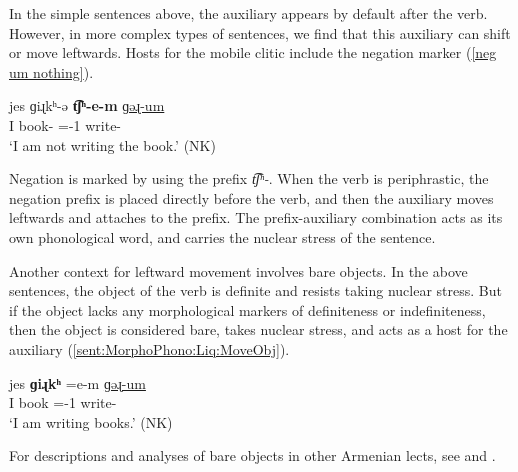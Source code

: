 In the simple sentences above, the auxiliary appears by default after the verb. However, in more complex types of sentences, we find that this auxiliary  can shift or move leftwards.  Hosts for the mobile clitic include the negation marker (\ref{neg um nothing}). 

\begin{exe}
	\ex \gll jes   ɡiɻkʰ-ə   \textbf{t͡ʃʰ\colorbox{lsLightGray}{-e-m}}   \uline{ɡəɻ-um}
	\\
	I   book-{}  {\neggloss}={\auxgloss}-1{\sg}  write-{\impfcvb} 
	\\
	\trans `I am not writing the book.'  \hfill (NK)\label{neg um nothing}
	\\
	
	
\end{exe}

Negation is marked by using the prefix \textit{t͡ʃʰ-}. When the verb is periphrastic, the negation prefix is placed directly before the verb, and then the auxiliary moves leftwards and attaches to the prefix. The prefix-auxiliary combination acts as its own phonological word, and   carries the nuclear stress of the sentence.  

Another context for leftward movement involves bare objects. In the above sentences, the object of the verb is  definite and resists taking nuclear stress. But if the object lacks any morphological markers of definiteness or indefiniteness, then the object is considered bare, takes nuclear stress, and acts as a host for the auxiliary (\ref{sent:MorphoPhono:Liq:MoveObj}).

\begin{exe}
	\ex \gll jes   \textbf{ɡiɻkʰ}   \colorbox{lsLightGray}{=e-m}   \uline{ɡəɻ-um}
	\\
	I   book  ={\auxgloss}-1{\sg}  write-{\impfcvb} 
	\\
	\trans `I am   writing   books.' \hfill (NK)\label{sent:MorphoPhono:Liq:MoveObj}
	\\
	
\end{exe}

For descriptions and analyses of bare objects in other Armenian lects, see   {\seaSE}  \citep{Comrie-1984-SomeFormalPropertiesFOcusEasternArmenian,Megerdoomian-2009-ThesisBook,Yeghiazaryan-2010-ArmenianCase,Crum-2020-EasternArmenianPseudoIncorporation} and {\swaSW} \citep{Sigler-1997-SpecificitySWADissertation,Sag-2019-SemanticsNumberMarkingReferenceKindsCountingOptionalClassifiers,Kalomoiros-2022-bareSingularPseudoIncorporationWesternArmenian}.



